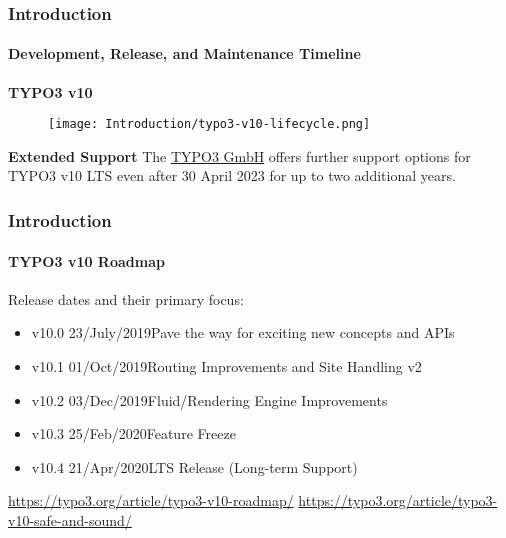
\begin{frame}[fragile]
	\frametitle{Introduction}
	\framesubtitle{Development, Release, and Maintenance Timeline}

	\textbf{TYPO3 v10}

	\begin{figure}
		\texttt{[image: Introduction/typo3-v10-lifecycle.png]}
	\end{figure}

	\textbf{Extended Support}\newline
	\smaller
		The \href{https://typo3.com}{TYPO3 GmbH} offers further support options
		for TYPO3 v10 LTS even after 30 April 2023 for up to two additional
		years.
	\normalsize

\end{frame}


\begin{frame}[fragile]
	\frametitle{Introduction}
	\framesubtitle{TYPO3 v10 Roadmap}

	Release dates and their primary focus:

	\begin{itemize}

		\item v10.0 \tabto{1.1cm}23/July/2019\tabto{3.4cm}Pave the way for exciting new concepts and APIs
		\item v10.1 \tabto{1.1cm}01/Oct/2019\tabto{3.4cm}Routing Improvements and Site Handling v2
		\item v10.2 \tabto{1.1cm}03/Dec/2019\tabto{3.4cm}Fluid/Rendering Engine Improvements
		\item
			\begingroup
				\color{typo3orange}
				v10.3 \tabto{1.1cm}25/Feb/2020\tabto{3.4cm}Feature Freeze
			\endgroup
		\item v10.4 \tabto{1.1cm}21/Apr/2020\tabto{3.4cm}LTS Release (Long-term Support)

	\end{itemize}

	\vspace{0.6cm}
	\smaller
		\url{https://typo3.org/article/typo3-v10-roadmap/}\newline
		\url{https://typo3.org/article/typo3-v10-safe-and-sound/}
	\normalsize

\end{frame}


